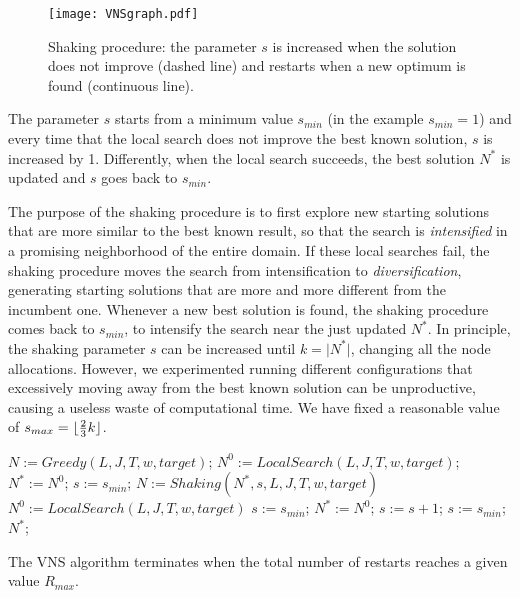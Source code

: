 \begin{figure}[h!tb]
\centering\texttt{[image: VNSgraph.pdf]}
\caption{Shaking procedure: the parameter $s$ is increased when the solution does not improve (dashed line) and restarts when a new optimum is found (continuous line).}
\label{fig:shaking}
\end{figure}
The parameter \(s\) starts from a minimum value \(s_{min}\) (in the example \(s_{min} = 1 \)) and every time that the local search does not improve the best known solution, \(s\) is increased by 1. Differently, when the local search succeeds, the best solution \(N^*\) is updated and \(s\) goes back to \(s_{min}\).

The purpose of the shaking procedure is to first explore new starting solutions that are more similar to the best known result, so that the search is \emph{intensified} in a promising neighborhood of the entire domain. If these local searches fail, the shaking procedure moves the search from intensification to \emph{diversification}, generating starting solutions that are more and more different from the incumbent one. Whenever a new best solution is found, the shaking procedure comes back to \(s_{min}\), to intensify the search near the just updated \(N^*\). In principle, the shaking parameter \(s\) can be increased until $k=\lvert N^* \rvert$, changing all the node allocations. However, we experimented running different configurations that excessively moving away from the best known solution can be unproductive, causing a useless waste of computational time. We have fixed a reasonable value of \(s_{max} = \lfloor\frac{2}{3}k\rfloor\).

\begin{algorithm}
\caption{\(VNS (L, J, T, w, target, s_{min}, s_{max}, R_{max})\)}
\begin{algorithmic}%
\label{alg:vns}
\State $N:=Greedy(L, J, T, w, target)$;
\State $N^{0}:=LocalSearch(L, J, T, w, target)$;
\State $N^* := N^0$;
\State $s := s_{min}$;
\State $N:= Shaking(N^*, s, L, J, T, w, target)$
\State $N^0:= LocalSearch(L, J, T, w, target)$
\State $s:=s_{min}$;
\State $N^*:=N^0$;
\Else
\State $s:=s+1$;
\State $s:=s_{min}$;
\EndIf
\EndIf
\EndFor
\State \Return $N^*$;
\end{algorithmic}
\end{algorithm}

The VNS algorithm terminates when the total number of restarts reaches a given value $R_{max}$.


